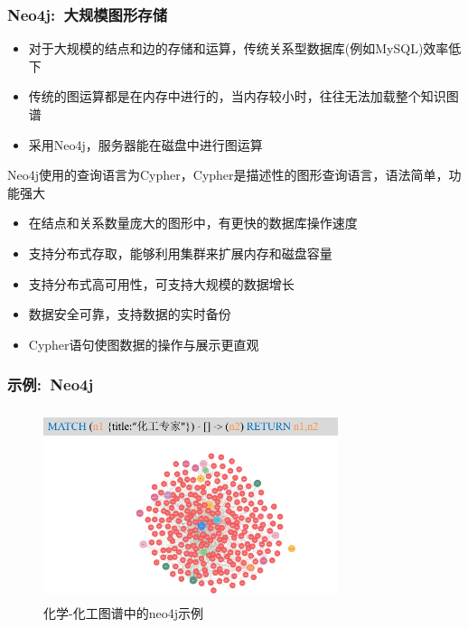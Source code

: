 \begin{frame}
	\frametitle{\textrm{Neo4j}:~大规模图形存储}
	\begin{itemize}
		\item 对于大规模的结点和边的存储和运算，传统关系型数据库\textrm{(例如MySQL)}效率低下%
		\item 传统的图运算都是在内存中进行的，当内存较小时，往往无法加载整个知识图谱
		\item 采用\textrm{Neo4j}，服务器能在磁盘中进行图运算 
	\end{itemize}
	\textrm{Neo4j}使用的查询语言为\textrm{Cypher}，\textrm{Cypher}是描述性的图形查询语言，语法简单，功能强大
	\begin{itemize}
		\item 在结点和关系数量庞大的图形中，有更快的数据库操作速度
		\item 支持分布式存取，能够利用集群来扩展内存和磁盘容量
		\item 支持分布式高可用性，可支持大规模的数据增长
		\item 数据安全可靠，支持数据的实时备份
		\item \textrm{Cypher}语句使图数据的操作与展示更直观
	\end{itemize}
\end{frame}

\begin{frame}
	\frametitle{示例:~\textrm{Neo4j}}
\begin{figure}[h!]
\centering
\vskip -8pt
\includegraphics[height=2.20in,width=3.40in,viewport=0 0 150 100,clip]{Figures/KG_Chem-Neo4j.png}
\caption{\tiny 化学-化工图谱中的\textrm{neo4j}示例}%
\label{Fig:KG_Chem-Neo4j}
\end{figure}
\end{frame}

